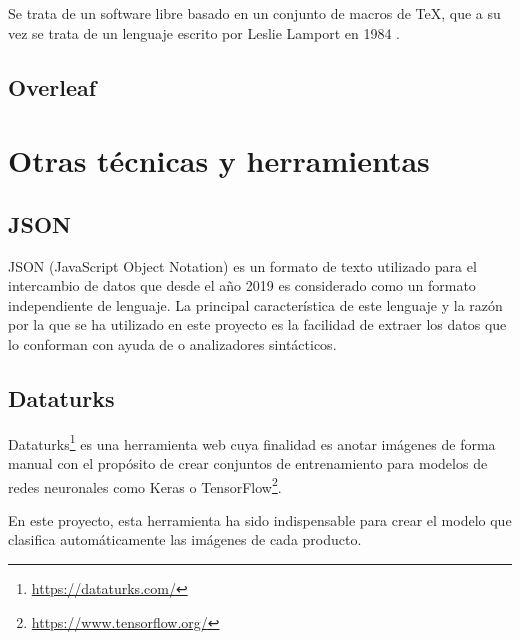 Se trata de un software libre basado en un conjunto de macros de \TeX, que a su vez se trata de un lenguaje escrito por Leslie Lamport en 1984 \cite{wiki:latex}.


\subsection{Overleaf}

\section{Otras técnicas y herramientas}


\subsection{JSON}
JSON (JavaScript Object Notation) es un formato de texto utilizado para el intercambio de datos que desde el año 2019 es considerado como un formato independiente de lenguaje. La principal característica de este lenguaje y la razón por la que se ha utilizado en este proyecto es la facilidad de extraer los datos que lo conforman  con ayuda de  o analizadores sintácticos.

\subsection{Dataturks}
Dataturks\footnote{\url{https://dataturks.com/}} es una herramienta web cuya finalidad es anotar imágenes de forma manual con el propósito de crear conjuntos de entrenamiento para modelos de redes neuronales como Keras o TensorFlow\footnote{\url{https://www.tensorflow.org/}}.

En este proyecto, esta herramienta ha sido indispensable para crear el modelo que clasifica automáticamente las imágenes de cada producto.
















